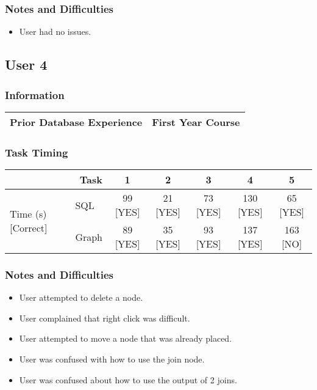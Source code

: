 \subsubsection{Notes and Difficulties}

\begin{itemize}

	\item
	User had no issues.

\end{itemize}

\subsection{User 4}

\subsubsection{Information}

\begin{tabular}{|l|l|}
	\hline
	\textbf{Prior Database Experience} & First Year Course \\
	\hline
\end{tabular}

\subsubsection{Task Timing}

\begin{tabular}{|l|l|c|c|c|c|c|}
	\hline
	\multicolumn{2}{|r|}{\textbf{Task}} & \textbf{1} & \textbf{2} & \textbf{3} & \textbf{4} & \textbf{5} \\
	\hline
	\multirow{2}{*}{Time (s) [Correct]} & SQL   & 99 [YES] & 21 [YES] & 73 [YES] & 130 [YES] & 65  [YES] \\
	                                    & Graph & 89 [YES] & 35 [YES] & 93 [YES] & 137 [YES] & 163 [NO]  \\
	\hline
\end{tabular}

\subsubsection{Notes and Difficulties}

\begin{itemize}

	\item
	User attempted to delete a node.

	\item
	User complained that right click was difficult.

	\item
	User attempted to move a node that was already placed.

	\item
	User was confused with how to use the join node.

	\item
	User was confused about how to use the output of 2 joins.

\end{itemize}